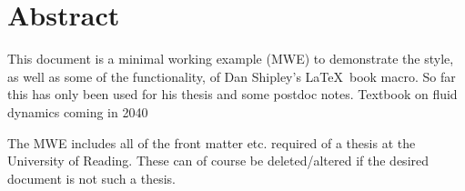 \chapter{Abstract}

This document is a minimal working example (MWE) to demonstrate the style, as well as some of the functionality, of Dan Shipley's \LaTeX\ book macro.
So far this has only been used for his thesis \parencite{phd:Shipley2021} and some postdoc notes.
Textbook on fluid dynamics coming in 2040\textellipsis

The MWE includes all of the front matter etc. required of a thesis at the University of Reading.
These can of course be deleted/altered if the desired document is not such a thesis.
